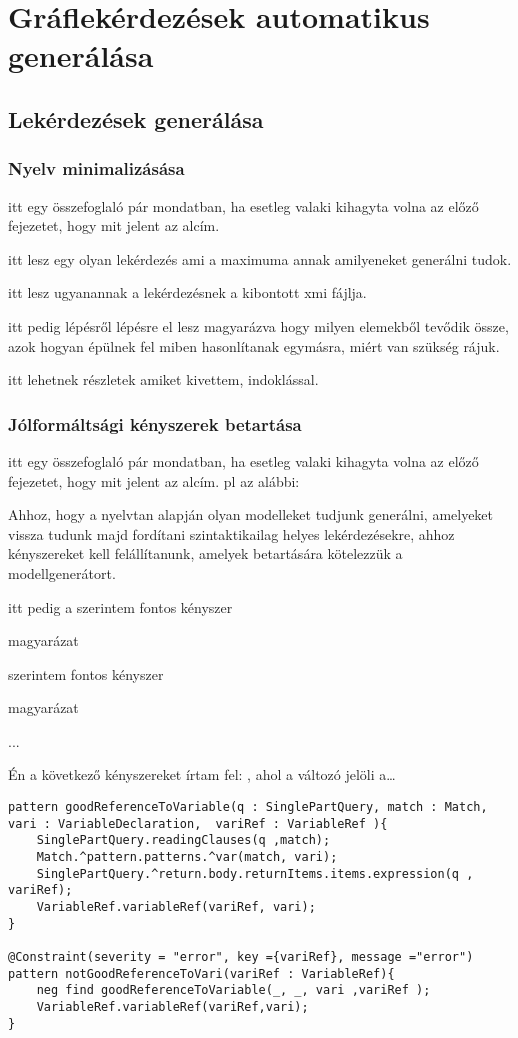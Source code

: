 \chapter{Gráflekérdezések automatikus generálása}
\section{Lekérdezések generálása}

\subsection{Nyelv minimalizásása}
itt egy összefoglaló pár mondatban, ha esetleg valaki kihagyta volna az előző fejezetet, hogy mit jelent az alcím.

itt lesz egy olyan lekérdezés ami a maximuma annak amilyeneket generálni tudok.

itt lesz ugyanannak a lekérdezésnek a kibontott xmi fájlja.

itt pedig lépésről lépésre el lesz magyarázva hogy milyen elemekből tevődik össze,
 azok hogyan épülnek fel
  miben hasonlítanak egymásra, 
  miért van szükség rájuk.
  
itt lehetnek részletek amiket kivettem, indoklással.

\subsection{Jólformáltsági kényszerek betartása}
itt egy összefoglaló pár mondatban, ha esetleg valaki kihagyta volna az előző fejezetet, hogy mit jelent az alcím. pl az alábbi:

Ahhoz, hogy a nyelvtan alapján olyan modelleket tudjunk generálni, amelyeket vissza tudunk majd fordítani szintaktikailag helyes lekérdezésekre, ahhoz kényszereket kell felállítanunk, amelyek betartására kötelezzük a modellgenerátort.

itt pedig a szerintem fontos kényszer

magyarázat

szerintem fontos kényszer

magyarázat

...



Én a következő kényszereket írtam fel:
, ahol a  változó jelöli a\ldots

\begin{lstlisting}[style=viatrasmall]
pattern goodReferenceToVariable(q : SinglePartQuery, match : Match, vari : VariableDeclaration,  variRef : VariableRef ){	
	SinglePartQuery.readingClauses(q ,match);
	Match.^pattern.patterns.^var(match, vari);
	SinglePartQuery.^return.body.returnItems.items.expression(q , variRef);
	VariableRef.variableRef(variRef, vari);
}	

@Constraint(severity = "error", key ={variRef}, message ="error")
pattern notGoodReferenceToVari(variRef : VariableRef){
	neg find goodReferenceToVariable(_, _, vari ,variRef );
	VariableRef.variableRef(variRef,vari);
}

\end{lstlisting}


